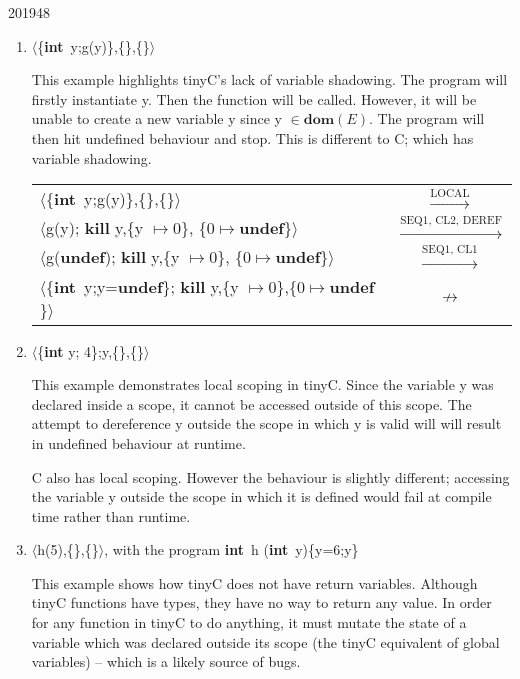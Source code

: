 \documentclass[10pt,\jkfside,a4paper]{article}
\begin{document}
\begin{examquestion}{2019}{4}{8}
\begin{enumerate}
\begin{enumerate}[label=(\roman*)]

\item $\langle$\{\textbf{int}~y;g(y)\},\{\},\{\}$\rangle$

This example highlights tinyC's lack of variable shadowing. The program will
firstly instantiate y. Then the function will be called. However, it will be
unable to create a new variable y since y $\in \textbf{dom}(E)$. The program
will then hit undefined behaviour and stop. This is different to C; which
has variable shadowing.

\begin{table}[H]
\centering
\begin{tabular}{l c}
$\langle$\{\textbf{int}~y;g(y)\},\{\},\{\}$\rangle$ &
$\stackrel{\text{LOCAL}}{\to}$ \\
$\langle$g(y); \textbf{kill} y,\{y $\mapsto 0$\},
\{$0\mapsto\textbf{undef}$\}$\rangle$ &
$\stackrel{\text{SEQ1, CL2, DEREF}}{\to}$ \\
$\langle$g(\textbf{undef}); \textbf{kill} y,\{y $\mapsto 0$\},
\{$0\mapsto\textbf{undef}$\}$\rangle$ &
$\stackrel{\text{SEQ1, CL1}}{\to}$ \\
$\langle$\{\textbf{int}~y;y=\textbf{undef}\}; \textbf{kill} y,\{y $\mapsto
0$\},\{$0\mapsto\textbf{undef}$\}$\rangle$ &
$\not\to$ \\
\end{tabular}
\end{table}

\item $\langle$\{\textbf{int} y; 4\};y,\{\},\{\}$\rangle$

This example demonstrates local scoping in tinyC. Since the variable y was
declared inside a scope, it cannot be accessed outside of this scope. The
attempt to dereference y outside the scope in which y is valid will will
result in undefined behaviour at runtime.

C also has local scoping. However the behaviour is slightly different;
accessing the variable y outside the scope in which it is defined would fail
at compile time rather than runtime.

\item $\langle$h(5),\{\},\{\}$\rangle$, with the program \textbf{int}~h
(\textbf{int}~y)\{y=6;y\}

This example shows how tinyC does not have return variables. Although tinyC
functions have types, they have no way to return any value. In order for any
function in tinyC to do anything, it must mutate the state of a variable
which was declared outside its scope (the tinyC equivalent of global
variables) -- which is a likely source of bugs.


\end{enumerate}
\end{enumerate}
\end{examquestion}
\end{document}
